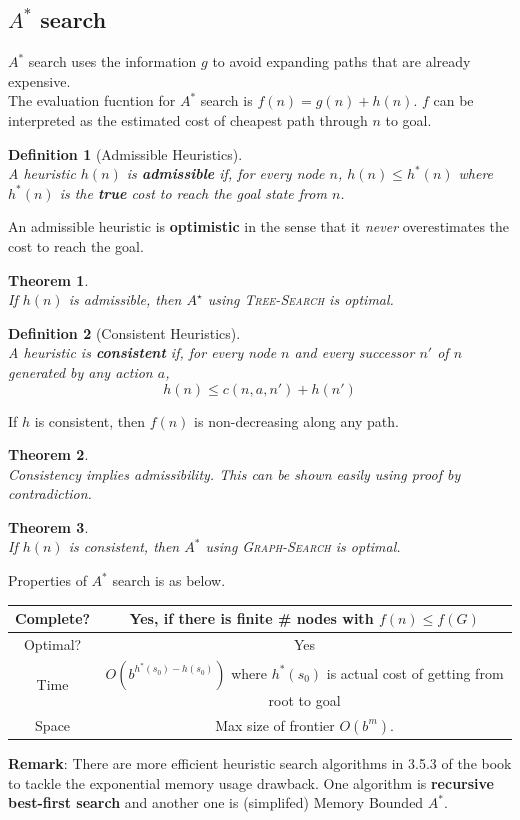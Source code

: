 \documentclass[12pt]{article}
\newtheorem{definition}{Definition}[section]
\newtheorem{theorem}{Theorem}[section]
\theoremstyle{definition}
\begin{document}
\subsection{$A^\ast$ search}
$A^\ast$ search uses the information $g$ to avoid expanding paths that are already expensive.\\
The evaluation fucntion for $A^\ast$ search is $f(n)=g(n)+h(n)$. $f$ can be interpreted as the estimated cost of cheapest path through $n$ to goal.\\
\begin{definition}[Admissible Heuristics]
\hfill\\\normalfont A heuristic $h(n)$ is \textbf{admissible} if, for every node $n$, $h(n)\leq h^\ast(n)$ where $h^\ast(n)$ is the \textbf{true} cost to reach the goal state from $n$.
\end{definition}
An admissible heuristic is \textbf{optimistic} in the sense that it \textit{never} overestimates the cost to reach the goal.
\begin{theorem}
\hfill\\\normalfont If $h(n)$ is admissible, then $A^\star$ using \textsc{Tree-Search} is optimal.
\end{theorem}
\begin{definition}[Consistent Heuristics]
\hfill\\\normalfont A heuristic is \textbf{consistent} if, for every node $n$ and every successor $n'$ of $n$ generated by any action $a$,
\[
h(n)\leq c(n,a,n')+h(n')
\]
\end{definition}
If $h$ is consistent, then $f(n)$ is non-decreasing along any path.
\begin{theorem}
\hfill\\\normalfont Consistency implies admissibility. This can be shown easily using proof by contradiction.
\end{theorem}
\begin{theorem}
\hfill\\\normalfont If $h(n)$ is consistent, then $A^\ast$ using \textsc{Graph-Search} is optimal.
\end{theorem}
Properties of $A^\ast$ search is as below.
\begin{table}[h]
\centering
\begin{tabular}{|c|c|}
\hline
Complete?&Yes, if there is finite \# nodes with $f(n)\leq f(G)$\\\hline
Optimal?&Yes\\\hline
Time&$O(b^{h^\ast(s_0)-h(s_0)})$ where $h^\ast(s_0)$ is actual cost of getting from root to goal\\\hline
Space& Max size of frontier $O(b^m)$.\\\hline
\end{tabular}
\end{table}
\textbf{Remark}: There are more efficient heuristic search algorithms in 3.5.3 of the book to tackle the exponential memory usage drawback. One algorithm is \textbf{recursive best-first search} and another one is (simplifed) Memory Bounded $A^\ast$. 
\end{document}
